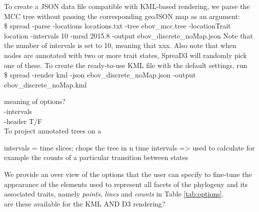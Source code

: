 \documentclass[english]{paper}
\begin{document}
To create a JSON data file compatible with KML-based rendering, we parse the MCC tree without passing the corresponding geoJSON map as an argument:
\\
\$ spread -parse -locations locations.txt -tree ebov\_mcc.tree -locationTrait location -intervals 10 -mrsd 2015.8 -output ebov\_discrete\_noMap.json
Note that the number of intervals is set to 10, meaning that xxx.
Also note that when nodes are annotated with two or more trait states, SpreaD3 will randomly pick one of these.  
To create the ready-to-use KML file with the default settings, run
\\
\$ spread -render kml -json ebov\_discrete\_noMap.json -output ebov\_discrete\_noMap.kml
\par
meaning of options?
\\-intervals
\\-header T/F
\\
To project annotated trees on a

intervals = time slices; chops the tree in n time intervals => used to calculate for example the counts of a particular transition between states
 
\par
We provide an over view of the options that the user can specify to fine-tune the appearance of the elements used to represent all facets of the phylogeny and its associated traits, namely \textit{points}, \textit{lines} and \textit{counts} in Table \ref{tab:options}.
\\are these available for the KML AND D3 rendering?
\end{document}
